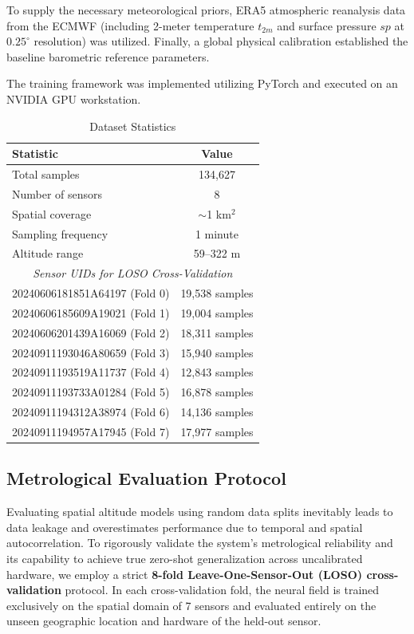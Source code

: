 To supply the necessary meteorological priors, ERA5 atmospheric reanalysis data from the ECMWF (including 2-meter temperature $t_{2m}$ and surface pressure $sp$ at $0.25^\circ$ resolution) was utilized. Finally, a global physical calibration established the baseline barometric reference parameters.

The training framework was implemented utilizing PyTorch and executed on an NVIDIA GPU workstation.

\begin{table}[t]
\caption{Dataset Statistics}
\label{tab:dataset}
\centering
\begin{tabular}{lc}
\toprule
\textbf{Statistic} & \textbf{Value} \\
\midrule
Total samples & 134,627 \\
Number of sensors & 8 \\
Spatial coverage & $\sim$1 km$^2$ \\
Sampling frequency & 1 minute \\
Altitude range & 59--322 m \\
\midrule
\multicolumn{2}{c}{\textit{Sensor UIDs for LOSO Cross-Validation}} \\
\midrule
20240606181851A64197 (Fold 0) & 19,538 samples \\
20240606185609A19021 (Fold 1) & 19,004 samples \\
20240606201439A16069 (Fold 2) & 18,311 samples \\
20240911193046A80659 (Fold 3) & 15,940 samples \\
20240911193519A11737 (Fold 4) & 12,843 samples \\
20240911193733A01284 (Fold 5) & 16,878 samples \\
20240911194312A38974 (Fold 6) & 14,136 samples \\
20240911194957A17945 (Fold 7) & 17,977 samples \\
\bottomrule
\end{tabular}
\end{table}


\subsection{Metrological Evaluation Protocol}
\label{subsec:eval_protocol}

Evaluating spatial altitude models using random data splits inevitably leads to data leakage and overestimates performance due to temporal and spatial autocorrelation. To rigorously validate the system's metrological reliability and its capability to achieve true zero-shot generalization across uncalibrated hardware, we employ a strict \textbf{8-fold Leave-One-Sensor-Out (LOSO) cross-validation} protocol. In each cross-validation fold, the neural field is trained exclusively on the spatial domain of 7 sensors and evaluated entirely on the unseen geographic location and hardware of the held-out sensor.

